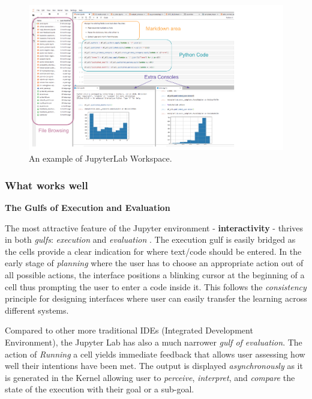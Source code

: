 \documentclass[12pt,letterpaper]{article}
\begin{document}
\begin{figure}[h]
\centering
\includegraphics[scale=.5]{figures/project-principles/jupyter.png}
\caption{An example of JupyterLab Workspace.}
\label{fig::1}
\end{figure}

\subsubsection*{What works well}

\textbf{The Gulfs of Execution and Evaluation}

The most attractive feature of the Jupyter environment - \textbf{interactivity} - thrives in both \textit{gulfs}: \textit{execution} and \textit{evaluation} \cite{norman2013design}. The execution gulf is easily bridged as the cells provide a clear indication for where text/code should be entered. In the early stage of \textit{planning} where the user has to choose an appropriate action out of all possible actions, the interface positions a blinking cursor at the beginning of a cell thus prompting the user to enter a code inside it. This follows the \textit{consistency} principle for designing interfaces where user can easily transfer the learning across different systems.

Compared to other more traditional IDEs (Integrated Development Environment), the Jupyter Lab has also a much narrower \textit{gulf of evaluation}. The action of \textit{Running} a cell yields immediate feedback that allows user assessing how well their intentions have been met. The output is displayed \textit{asynchronously} as it is generated in the Kernel allowing user to \textit{perceive}, \textit{interpret}, and \textit{compare} the state of the execution with their goal or a sub-goal.
\end{document}
